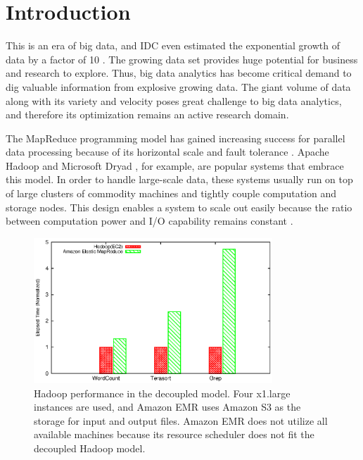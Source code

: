 \section{Introduction}

This is an era of big data, and IDC even estimated the exponential growth of data by a factor of 10 \cite{KouzesR2009_ChangingParadigm, SakrR2011_Survey}.
The growing data set provides huge potential for business and research to explore.
Thus, big data analytics has become critical demand to dig valuable information from explosive growing data.
The giant volume of data along with its variety and velocity poses great challenge to big data analytics\cite{PaulZik2011_UnderstandingBigData}, and therefore its optimization remains an active research domain.

The MapReduce programming model has gained increasing success for parallel data processing because of its horizontal scale and fault tolerance \cite{DeanJ2004_MapReduce}.
Apache Hadoop \cite{hadoop} and Microsoft Dryad \cite{IsardM2007_Dyrad}, for example, are popular systems that embrace this model.
In order to handle large-scale data, these systems usually run on top of large clusters of commodity machines and tightly couple computation and storage nodes.
This design enables a system to scale out easily because the ratio between computation power and I/O capability remains constant \cite{DeanJ2004_MapReduce, hadoop, BellG2006_Petascale}.

\begin{figure}[ht]
    \centering
    \includegraphics[width=0.8\textwidth]{figures/decoupled_performance.eps}
    \caption{Hadoop performance in the decoupled model.  Four x1.large instances are used, and Amazon EMR uses Amazon S3 as the storage for input and output files.  Amazon EMR does not utilize all available machines because its resource scheduler does not fit the decoupled Hadoop model.}
    \label{fig:decoupled_performance}
\end{figure}

